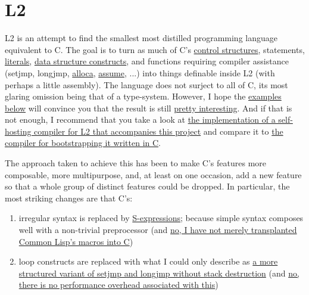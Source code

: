\documentclass[]{article}
\date{}
\providecommand{\tightlist}{%
  \setlength{\itemsep}{0pt}\setlength{\parskip}{0pt}}
\begin{document}
\hypertarget{l2}{%
\section{L2}\label{l2}}

L2 is an attempt to find the smallest most distilled programming
language equivalent to C. The goal is to turn as much of C's
\protect\hyperlink{switch-expression}{control structures}, statements,
\protect\hyperlink{strings}{literals}, \protect\hyperlink{fields}{data
structure constructs}, and functions requiring compiler assistance
(setjmp, longjmp, \protect\hyperlink{examples}{alloca},
\protect\hyperlink{assume}{assume}, ...) into things definable inside L2
(with perhaps a little assembly). The language does not surject to all
of C, its most glaring omission being that of a type-system. However, I
hope the \protect\hyperlink{examplesreductions}{examples below} will
convince you that the result is still
\protect\hyperlink{closures}{pretty interesting}. And if that is not
enough, I recommend that you take a look at \href{src/compile.l2}{the
implementation of a self-hosting compiler for L2 that accompanies this
project} and compare it to \href{bootstrap/compile.c}{the compiler for
bootstrapping it written in C}.

The approach taken to achieve this has been to make C's features more
composable, more multipurpose, and, at least on one occasion, add a new
feature so that a whole group of distinct features could be dropped. In
particular, the most striking changes are that C's:

\begin{enumerate}
\def\labelenumi{\arabic{enumi}.}
\tightlist
\item
  irregular syntax is replaced by
  \protect\hyperlink{internal-representation}{S-expressions}; because
  simple syntax composes well with a non-trivial preprocessor (and
  \protect\hyperlink{expression}{no, I have not merely transplanted
  Common Lisp's macros into C})
\item
  loop constructs are replaced with what I could only describe as
  \protect\hyperlink{with}{a more structured variant of setjmp and
  longjmp without stack destruction} (and
  \protect\hyperlink{an-optimization}{no, there is no performance
  overhead associated with this})
\end{enumerate}
\end{document}
